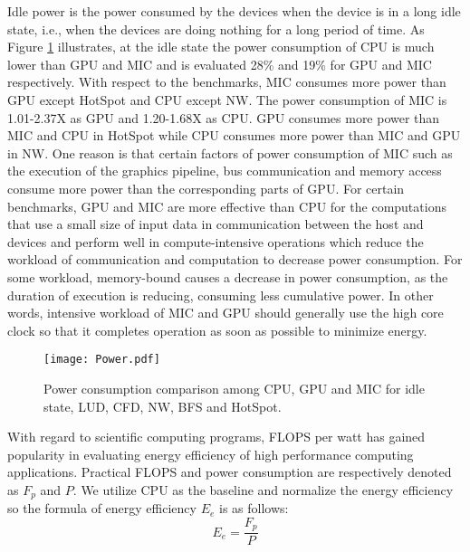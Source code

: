  Idle power is the power consumed by the devices when the device is in a long idle state, i.e., when the devices are doing nothing for a long period of time. As Figure \ref{fig:power} illustrates, at the idle state the power consumption of CPU is much lower than GPU and MIC and is evaluated 28\% and 19\% for GPU and MIC respectively. With respect to the benchmarks, MIC consumes more power than GPU except HotSpot and CPU except NW. The power consumption of MIC is 1.01-2.37X as GPU and 1.20-1.68X as CPU. GPU consumes more power than MIC and CPU in HotSpot while CPU consumes more power than MIC and GPU in NW. One reason is that certain factors of power consumption of MIC such as the execution of the graphics pipeline, bus communication and memory access consume more power than the corresponding parts of GPU. For certain benchmarks, GPU and MIC are more effective than CPU for the computations that use a small size of input data in communication between the host and devices and perform well in compute-intensive operations which reduce the workload of communication and computation to decrease power consumption. For some workload, memory-bound causes a decrease in power consumption, as the duration of execution is reducing, consuming less cumulative power. In other words, intensive workload of MIC and GPU should generally use the high core clock so that it completes operation as soon as possible to minimize energy. 

    \begin{figure}[h!]
  \centering
  \begin{minipage}{0.5\textwidth}
    \centering
   \centering
     \texttt{[image: Power.pdf]}    
\caption{Power consumption comparison among CPU, GPU and MIC for idle state, LUD, CFD, NW, BFS and HotSpot.}
\label{fig:power}
\end{minipage}%
\end{figure}


With regard to scientific computing programs, FLOPS per watt has gained popularity in evaluating energy efficiency of high performance computing applications. Practical FLOPS and power consumption are respectively denoted as $F_{p}$ and $P$. We utilize CPU as the baseline and normalize the energy efficiency so the formula of energy efficiency $E_{e}$ is as follows:
\begin{equation}\label{equ:energyE}
	{E_{e}} = \frac{F_{p}}{P}
\end{equation}
  
